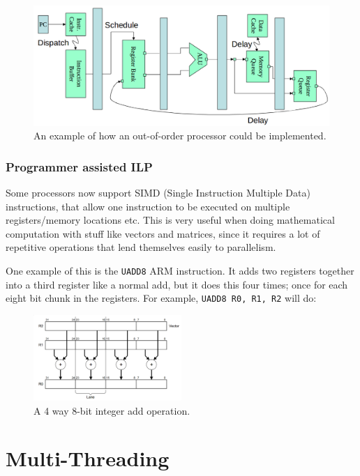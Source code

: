 \begin{figure}[H]
  \centering
  \includegraphics[width=\textwidth]{images/out-of-order}
  \caption{An example of how an out-of-order processor could be implemented.}
  \label{out-of-order}
\end{figure}

\subsubsection{Programmer assisted ILP}

Some processors now support SIMD (Single Instruction Multiple Data)
instructions, that allow one instruction to be executed on multiple
registers/memory locations etc. This is very useful when doing mathematical
computation with stuff like vectors and matrices, since it requires a lot of
repetitive operations that lend themselves easily to parallelism.

One example of this is the \texttt{UADD8} ARM instruction. It adds two registers
together into a third register like a normal add, but it does this four times;
once for each eight bit chunk in the registers. For example, \texttt{UADD8 R0,
R1, R2} will do:

\begin{figure}[H]
  \centering
  \includegraphics[width=0.5\textwidth]{images/UADD8}
  \caption{A 4 way 8-bit integer add operation.}
  \label{UADD8}
\end{figure}

\section{Multi-Threading}

